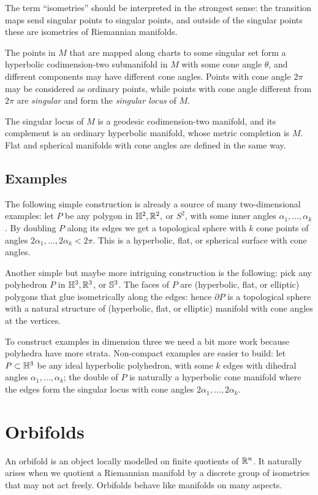 The term ``isometries'' should be interpreted in the strongest sense: the transition maps send singular points to singular points, and outside of the singular points these are isometries of Riemannian manifolds.

The points in $M$ that are mapped along charts to some singular set form a hyperbolic codimension-two submanifold in $M$ with some cone angle $\theta$, and different components may have different cone angles.
Points with cone angle $2\pi$ may be considered as ordinary points, while points with cone angle different from $2\pi$ are \emph{singular} and form the \emph{singular locus} of $M$.

The singular locus of $M$ is a geodesic codimension-two manifold, and its complement is an ordinary hyperbolic manifold, whose metric completion is $M$.
Flat and spherical manifolds with cone angles are defined in the same way.  

\subsection{Examples}
The following simple construction is already a source of many two-dimensional examples: let $P$ be any polygon in $\mathbb{H}^2, \mathbb{R}^2,$ or $S^2$, with some inner angles $\alpha_1,\ldots, \alpha_k$. By doubling $P$ along its edges we get a topological sphere with $k$ cone points of angles $2\alpha_1, \ldots, 2\alpha_k < 2\pi$. This is a hyperbolic, flat, or spherical surface with cone angles.

Another simple but maybe more intriguing construction is the following: pick any polyhedron $P$ in $\mathbb{H}^3, \mathbb{R}^3$, or $\mathbb{S}^3$. The faces of $P$ are (hyperbolic, flat, or elliptic) polygons that glue isometrically along the edges: hence $\partial P$ is a topological sphere with a natural structure of (hyperbolic, flat, or elliptic) manifold with cone angles at the vertices.

To construct examples in dimension three we need a bit more work because polyhedra have more strata. Non-compact examples are easier to build: let $P\subset \mathbb{H}^3$ be any ideal hyperbolic polyhedron, with some $k$ edges with dihedral angles $\alpha_1,\ldots, \alpha_k$; the double of $P$ is naturally a hyperbolic cone manifold where the edges form the singular locus with cone angles $2\alpha_1, \ldots, 2\alpha_k$.

\section{Orbifolds} 
An orbifold is an object locally modelled on finite quotients of $\mathbb{R}^n$. It naturally arises when we quotient a Riemannian manifold by a discrete group of isometries that may not act freely. Orbifolds behave like manifolds on many aspects.

